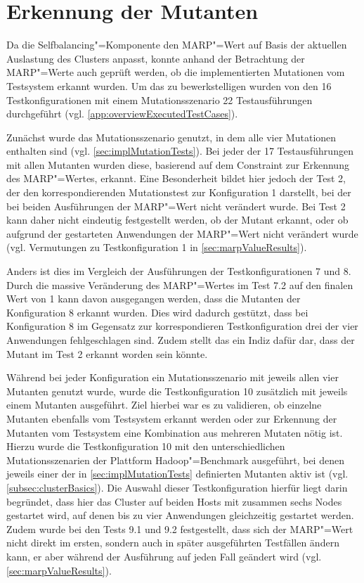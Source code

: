 \section{Erkennung der Mutanten}
\label{sec:killingMutants}

Da die Selfbalancing"=Komponente den \gls{MARP}"=Wert auf Basis der aktuellen Auslastung des Clusters anpasst, konnte anhand der Betrachtung der \gls{MARP}"=Werte auch geprüft werden, ob die implementierten Mutationen vom Testsystem erkannt wurden.
Um das zu bewerkstelligen wurden von den 16 Testkonfigurationen mit einem Mutationsszenario 22 Testausführungen durchgeführt (vgl. \cref{app:overviewExecutedTestCases}).

Zunächst wurde das Mutationsszenario genutzt, in dem alle vier Mutationen enthalten sind (vgl. \cref{sec:implMutationTests}).
Bei jeder der 17 Testausführungen mit allen Mutanten wurden diese, basierend auf dem Constraint zur Erkennung des \gls{MARP}"=Wertes, erkannt.
Eine Besonderheit bildet hier jedoch der Test 2, der den korrespondierenden Mutationstest zur Konfiguration 1 darstellt, bei der bei beiden Ausführungen der \gls{MARP}"=Wert nicht verändert wurde.
Bei Test 2 kann daher nicht eindeutig festgestellt werden, ob der Mutant erkannt, oder ob aufgrund der gestarteten Anwendungen der \gls{MARP}"=Wert nicht verändert wurde (vgl. Vermutungen zu Testkonfiguration 1 in \cref{sec:marpValueResults}).

Anders ist dies im Vergleich der Ausführungen der Testkonfigurationen 7 und 8.
Durch die massive Veränderung des \gls{MARP}"=Wertes im Test 7.2 auf den finalen Wert von 1 kann davon ausgegangen werden, dass die Mutanten der Konfiguration 8 erkannt wurden.
Dies wird dadurch gestützt, dass bei Konfiguration 8 im Gegensatz zur korrespondieren Testkonfiguration drei der vier Anwendungen fehlgeschlagen sind.
Zudem stellt das ein Indiz dafür dar, dass der Mutant im Test 2 erkannt worden sein könnte.

Während bei jeder Konfiguration ein Mutationsszenario mit jeweils allen vier Mutanten genutzt wurde, wurde die Testkonfiguration 10 zusätzlich mit jeweils einem Mutanten ausgeführt.
Ziel hierbei war es zu validieren, ob einzelne Mutanten ebenfalls vom Testsystem erkannt werden oder zur Erkennung der Mutanten vom Testsystem eine Kombination aus mehreren Mutaten nötig ist.
Hierzu wurde die Testkonfiguration 10 mit den unterschiedlichen Mutationsszenarien der Plattform Hadoop"=Benchmark ausgeführt, bei denen jeweils einer der in \cref{sec:implMutationTests} definierten Mutanten aktiv ist (vgl. \cref{subsec:clusterBasics}).
Die Auswahl dieser Testkonfiguration hierfür liegt darin begründet, dass hier das Cluster auf beiden Hosts mit zusammen sechs Nodes gestartet wird, auf denen bis zu vier Anwendungen gleichzeitig gestartet werden.
Zudem wurde bei den Tests 9.1 und 9.2 festgestellt, dass sich der \gls{MARP}"=Wert nicht direkt im ersten, sondern auch in später ausgeführten Testfällen ändern kann, er aber während der Ausführung auf jeden Fall geändert wird (vgl. \cref{sec:marpValueResults}).

